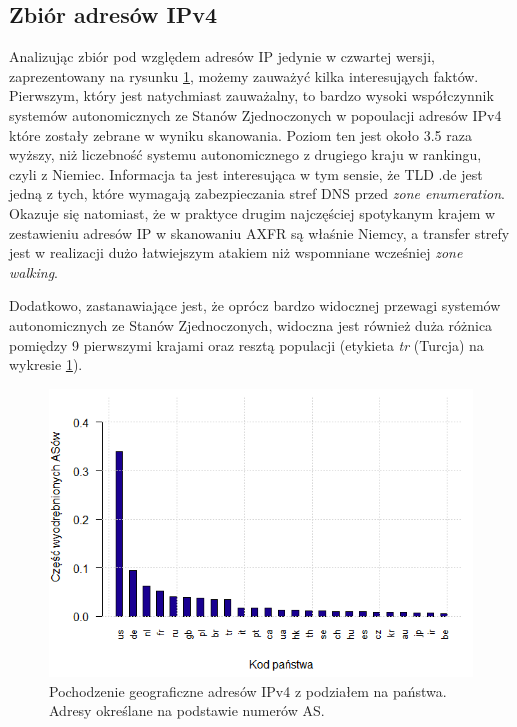 \subsection{Zbiór adresów IPv4}
\label{sec:ipv4_results}
Analizując zbiór pod względem adresów IP jedynie w czwartej wersji, zaprezentowany na rysunku \ref{fig:ipv4_countries}, możemy
zauważyć kilka interesująych faktów. Pierwszym, który jest natychmiast zauważalny, to bardzo wysoki współczynnik systemów autonomicznych
ze Stanów Zjednoczonych w popoulacji adresów IPv4 które zostały zebrane w wyniku skanowania. Poziom ten jest około 3.5 raza wyższy,
niż liczebność systemu autonomicznego z drugiego kraju w rankingu, czyli z Niemiec. Informacja ta jest interesująca w tym sensie, że
TLD .de jest jedną z tych, które wymagają zabezpieczania stref DNS przed \textit{zone enumeration}\cite{euLaw, zoneEnumeration}.
Okazuje się natomiast,
że w praktyce drugim najczęściej spotykanym krajem w zestawieniu adresów IP w skanowaniu AXFR są właśnie Niemcy, a transfer strefy
jest w realizacji dużo łatwiejszym atakiem niż wspomniane wcześniej \textit{zone walking}.

Dodatkowo, zastanawiające jest, że oprócz bardzo widocznej przewagi systemów autonomicznych ze Stanów Zjednoczonych, widoczna jest
również duża różnica pomiędzy 9 pierwszymi krajami oraz resztą populacji (etykieta \textit{tr} (Turcja) na wykresie \ref{fig:ipv4_countries}).

\begin{figure}[ht]
	\centering
	\includegraphics[width=1.0\textwidth]{image/ipv4_as_countries_no_title}
	\caption{Pochodzenie geograficzne adresów IPv4 z podziałem na państwa. Adresy określane na podstawie numerów AS.}
	\label{fig:ipv4_countries}
\end{figure}

